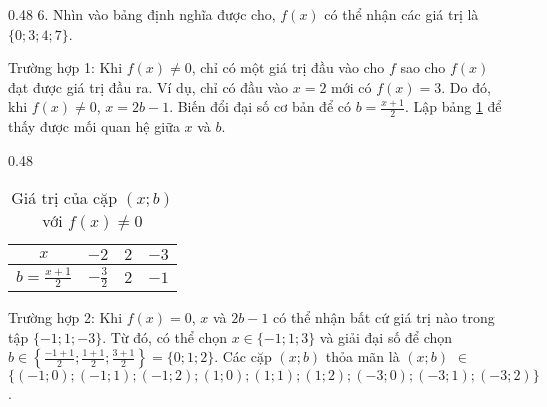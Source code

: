 {
   \begin{minipageindent}{0.48\textwidth}
      6. Nhìn vào bảng định nghĩa được cho, $f(x)$ có thể nhận các giá trị là $\{0; 3; 4; 7\}$.

      \textcolor{colorEmphasis}{Trường hợp 1}: Khi $f(x) \neq 0$, chỉ có một giá trị đầu vào cho $f$ sao cho $f(x)$ đạt được giá trị đầu ra. Ví dụ, chỉ có đầu vào $x = 2$ mới có $f(x) = 3$. Do đó, khi $f(x) \neq 0$, $x = 2b-1$. Biến đổi đại số cơ bản để có $b = \frac{x + 1}{2}$. Lập bảng \ref{tab:ham_so_mot_bien:dinh_nghia:b_values7} để thấy được mối quan hệ giữa $x$ và $b$.

   \end{minipageindent}
   \hfill
   \begin{minipageindent}{0.48\textwidth}
      \begin{table}[H]
         \centering
         \begin{tabular}{|c|c|c|c|}
            \hline
            $x$ & $-2$ & $2$ & $-3$\\
            \hline
            $b = \frac{x+1}{2}$ & $-\frac{3}{2}$ & $2$ & $-1$\\
            \hline
         \end{tabular}
         \caption{Giá trị của cặp $(x; b)$ với $f(x) \neq 0$}
         \label{tab:ham_so_mot_bien:dinh_nghia:b_values7}
      \end{table}
   \end{minipageindent}
}

\textcolor{colorEmphasisCyan}{Trường hợp 2}: Khi $f(x) = 0$, $x$ và $2b-1$ có thể nhận bất cứ giá trị nào trong tập $\{-1; 1; -3\}$. Từ đó, có thể chọn $x \in \{-1; 1; 3\}$ và giải đại số để chọn $b \in \left\{\frac{-1+1}{2}; \frac{1+1}{2}; \frac{3+1}{2}\right\} = \{0; 1; 2\}$. Các cặp $(x; b)$ thỏa mãn là $(x; b)$ $\in$ $\{\left(-1; 0\right); \left(-1; 1\right); \left(-1; 2\right); \left(1; 0\right); \left(1; 1\right); \left(1; 2\right); \left(-3; 0\right); \left(-3; 1\right); \left(-3; 2\right)\}$.

